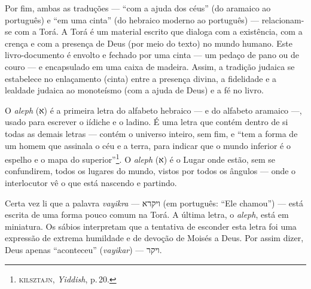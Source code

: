 Por fim, ambas as traduções --- ``com a ajuda dos céus'' (do
aramaico ao português) e ``em uma cinta'' (do hebraico moderno ao
português) --- relacionam-se com a Torá. A Torá é um
material escrito que dialoga com a existência, com a crença e com a
presença de Deus (por meio do texto) no mundo humano. Este
livro-documento é envolto e fechado por uma cinta --- um pedaço de pano
ou de couro --- e encapsulado em uma caixa de madeira. Assim, a tradição
judaica se estabelece no enlaçamento (cinta) entre a presença divina, a
fidelidade e a lealdade judaica ao monoteísmo (com a ajuda de Deus) e a
fé no livro.

\begin{center}\end{center}

\noindent{}O \emph{aleph} ({א}) é a primeira letra do alfabeto hebraico --- e do
alfabeto aramaico ---, usado para escrever o iídiche e o ladino.
É uma letra que contém dentro de si todas as demais letras --- contém o
universo inteiro, sem fim, e ``tem a forma de um homem que
assinala o céu e a terra, para indicar que o mundo inferior é o espelho
e o mapa do superior''\footnote{\textsc{kilsztajn}, \emph{Yiddish}, p.\,20.}. O
\emph{aleph} ({א}) é o Lugar onde estão, sem se confundirem, todos os
lugares do mundo, vistos por todos os ângulos --- onde o interlocutor vê
o que está nascendo e partindo.

Certa vez li que a palavra \emph{vayikra} --- {ויקרא} (em português:
``Ele chamou'') --- está escrita de uma forma pouco comum na
Torá. A última letra, o \emph{aleph}, está em miniatura. Os
sábios interpretam que a tentativa de esconder esta letra foi uma
expressão de extrema humildade e de devoção de Moisés a Deus. Por assim
dizer, Deus apenas ``aconteceu'' (\emph{vayikar}) --- {ויקר}.



